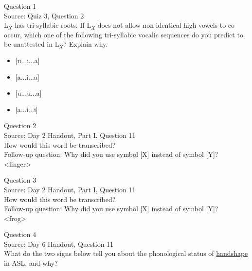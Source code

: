 \documentclass[12pt]{article}
\begin{document}
{\large Question 1}\\

Source: Quiz 3, Question 2\\

L$_X$ has tri-syllabic roots. If L$_X$ does not allow non-identical high vowels to co-occur, which one of the following tri-syllabic vocalic sequences do you predict to be unattested in L$_X$? Explain why.\\

\begin{itemize} \item {[u...i...a]} \item {[a...i...a]} \item {[u...u...a]} \item {[a...i...i]} \end{itemize}


\newpage

{\large Question 2}\\

Source: Day 2 Handout, Part I, Question 11\\

How would this word be transcribed?\\ Follow-up question: Why did you use symbol [X] instead of symbol [Y]?\\

<finger>


\newpage

{\large Question 3}\\

Source: Day 2 Handout, Part I, Question 11\\

How would this word be transcribed?\\ Follow-up question: Why did you use symbol [X] instead of symbol [Y]?\\

<frog>


\newpage

{\large Question 4}\\

Source: Day 6 Handout, Question 11\\

What do the two signs below tell you about the phonological status of \underline{handshape} in ASL, and why?\\
\end{document}
